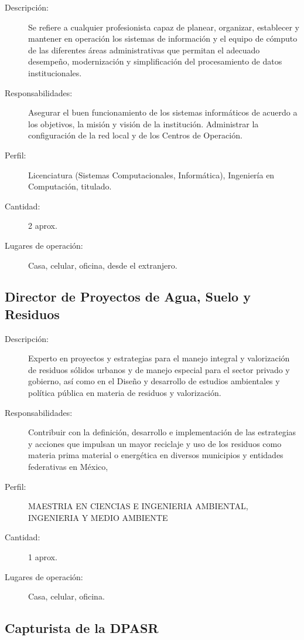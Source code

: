 \begin{description}
	\item[Descripción: ] Se refiere a cualquier profesionista capaz de planear, organizar, establecer y mantener en operación los sistemas de	información y el equipo de cómputo de las diferentes áreas administrativas que
	permitan el adecuado desempeño, modernización y simplificación del
	procesamiento de datos institucionales.
	\item[Responsabilidades: ] Asegurar el buen funcionamiento de los sistemas informáticos de acuerdo a
	los objetivos, la misión y visión de la institución.
	Administrar la configuración de la red local y de los Centros de Operación. 
	\item[Perfil: ]Licenciatura (Sistemas Computacionales, Informática), Ingeniería en
	Computación, titulado. 
	\item[Cantidad: ] 2 aprox. 
	\item[Lugares de operación: ] Casa, celular, oficina, desde el extranjero.
\end{description}


\subsection{Director de Proyectos de Agua, Suelo y Residuos}

\begin{description}
	\item[Descripción: ] Experto en proyectos y estrategias para el manejo integral y valorización de residuos sólidos urbanos y de manejo especial para el sector privado y gobierno, así como en el Diseño y desarrollo de estudios ambientales y política pública en materia de residuos y valorización.
	\item[Responsabilidades: ] Contribuir con la definición, desarrollo e implementación de las estrategias y acciones que  impulsan un mayor reciclaje y uso de los residuos como materia prima material o energética en diversos municipios y entidades federativas en México,
	\item[Perfil: ]MAESTRIA EN CIENCIAS E INGENIERIA AMBIENTAL, INGENIERIA Y MEDIO AMBIENTE

	\item[Cantidad: ] 1 aprox. 
	\item[Lugares de operación: ] Casa, celular, oficina.
\end{description}

\subsection{Capturista de la DPASR}

